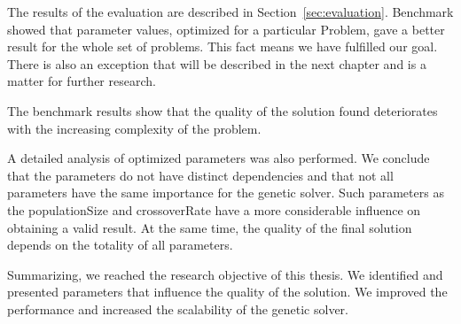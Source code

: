 The results of the evaluation are described in Section~\ref{sec:evaluation}.
Benchmark showed that parameter values, optimized for a particular Problem, gave a better result for the whole set of problems. This fact means we have fulfilled our goal. There is also an exception that will be described in the next chapter and is a matter for further research.

The benchmark results show that the quality of the solution found deteriorates with the increasing complexity of the problem.

A detailed analysis of optimized parameters was also performed. We conclude that the parameters do not have distinct dependencies and that not all parameters have the same importance for the genetic solver. Such parameters as the populationSize and crossoverRate have a more considerable influence on obtaining a valid result. At the same time, the quality of the final solution depends on the totality of all parameters.

Summarizing, we reached the research objective of this thesis. We identified and presented parameters that influence the quality of the solution. We improved the performance and increased the scalability of the genetic solver.
